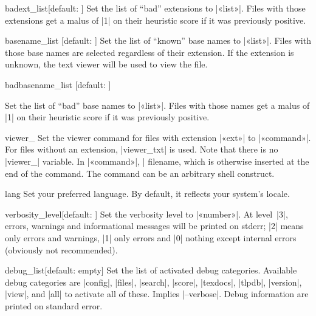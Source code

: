 \documentclass{texdoc-doc}
\begin{document}
\begin{confitem}{badext\_list}{}[default: ]
Set the list of ``bad'' extensions to |«list»|. Files with those extensions get
a malus of |1| on their heuristic score if it was previously positive.
\end{confitem}

\begin{confitem}{basename\_list}
  {}[default: ]
Set the list of ``known'' base names to |«list»|. Files with those base names
are selected regardless of their extension. If the extension is unknown, the
text viewer will be used to view the file.
\end{confitem}

\begin{confitem}{badbasename\_list}
  {}[default: ]

Set the list of ``bad'' base names to |«list»|. Files with those names get a
malus of |1| on their heuristic score if it was previously positive.
\end{confitem}

\begin{confitem}{viewer\_}{}
Set the viewer command for files with extension |«ext»| to |«command»|. For
files without an extension, |viewer_txt| is used. Note that there is no
|viewer_| variable. In |«command»|, |%
filename, which is otherwise inserted at the end of the command. The command
can be an arbitrary shell construct.
\end{confitem}

\begin{confitem}{lang}{}
Set your preferred language. By default, it reflects your system's locale.
\end{confitem}

\begin{confitem}{verbosity\_level}{}[default: ]
Set the verbosity level to |«number»|. At level~|3|, errors, warnings and
informational messages will be printed on stderr; |2| means only errors and
warnings, |1| only errors and |0| nothing except internal errors (obviously not
recommended).
\end{confitem}

\begin{confitem}{debug\_list}{}[default: empty]
Set the list of activated debug categories. Available debug categories are
|config|, |files|, |search|, |score|, |texdocs|, |tlpdb|, |version|, |view|,
and |all| to activate all of these. Implies |--verbose|. Debug information are
printed on standard error.
\end{confitem}
\end{document}
